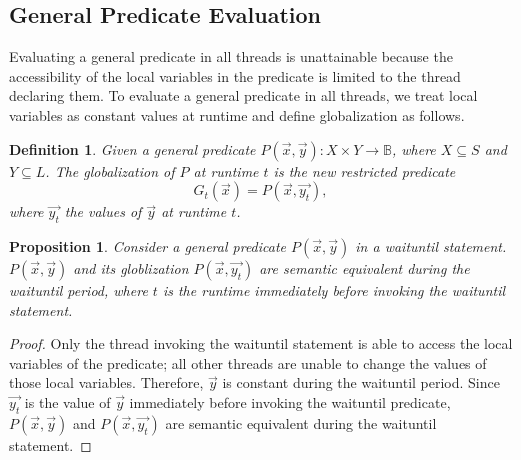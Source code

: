 \documentclass[preprint]{sigplanconf}
\newtheorem{definition}{Definition}
\newtheorem{proposition}{Proposition}
\begin{document}
\subsection{General Predicate Evaluation}

Evaluating a general predicate in all threads is unattainable 
because the accessibility of the local variables in the predicate is limited 
to the thread declaring them. To evaluate a general predicate in all 
threads, we treat local variables as constant values at runtime and define 
globalization as follows. 
\begin{definition}
    Given a general predicate $P(\vec{x}, \vec{y}): X \times Y \rightarrow 
    \mathbb{B}$, where $X \subseteq S$ and $Y \subseteq L$. The globalization 
    of $P$ at runtime $t$ is the new restricted predicate
    \[
    G_t(\vec{x}) = P(\vec{x}, \vec{y_t}),
    \]
    where $\vec{y_t}$ the values of $\vec{y}$ at runtime $t$.
\end{definition}
\begin{proposition} \label{pro:glob}
    Consider a general predicate $P(\vec{x}, \vec{y})$ in a waituntil 
    statement. $P(\vec{x}, \vec{y})$ and its globlization 
    $P(\vec{x}, \vec{y_t})$ are semantic equivalent during the waituntil 
    period, where $t$ is the runtime immediately before invoking the 
    waituntil statement.  
\end{proposition}
\begin{proof}
    Only the thread invoking the waituntil statement is able to access the
    local variables of the predicate; all other threads are unable to change
    the values of those local variables. Therefore, $\vec{y}$ is constant 
    during the waituntil period. Since $\vec{y_t}$ is the value of $\vec{y}$
    immediately before invoking the waituntil predicate, $P(\vec{x}, \vec{y})$
    and $P(\vec{x}, \vec{y_t})$ are semantic equivalent during the waituntil
    statement. 
\end{proof}
\end{document}
